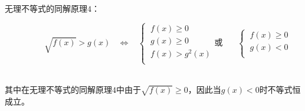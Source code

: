 \documentclass[UTF8]{ctexart}
\begin{document}
    无理不等式的同解原理$4$：
    \begin{large}
        \begin{equation*}
            ~~~~~~~~~~~~~~~~
            \sqrt{f(x)}>g(x)~~~~\Longleftrightarrow~~~~
            \begin{cases}
                ~f(x)\geq 0\\[1mm]
                ~g(x)\geq 0\\[1mm]
                ~f(x)>g^2(x)\\[1mm]
            \end{cases}
            \text{或}~~~~~~~~
            \begin{cases}
                ~f(x)\geq 0\\[1mm]
                ~g(x)<0\\[1mm]
            \end{cases}
        \end{equation*}
    \end{large}\\
    其中在无理不等式的同解原理$4$中由于$\sqrt{f(x)}\geq 0$，因此当$g(x)<0$时不等式恒成立。

\newpage
\end{document}
